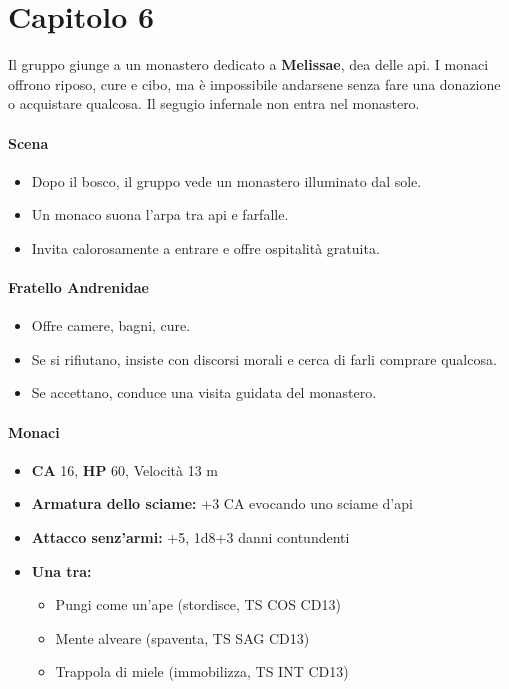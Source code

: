 \documentclass{article}
\begin{document}
\section{Capitolo 6}
Il gruppo giunge a un monastero dedicato a \textbf{Melissae}, dea delle api. I monaci offrono riposo, cure e cibo, ma è impossibile andarsene senza fare una donazione o acquistare qualcosa. Il segugio infernale non entra nel monastero.

\paragraph{Scena}
\begin{itemize}
    \item Dopo il bosco, il gruppo vede un monastero illuminato dal sole.
    \item Un monaco suona l’arpa tra api e farfalle.
    \item Invita calorosamente a entrare e offre ospitalità gratuita.
\end{itemize}

\paragraph{Fratello Andrenidae}
\begin{itemize}
    \item Offre camere, bagni, cure.
    \item Se si rifiutano, insiste con discorsi morali e cerca di farli comprare qualcosa.
    \item Se accettano, conduce una visita guidata del monastero.
\end{itemize}

\paragraph{Monaci}
\begin{itemize}
    \item \textbf{CA} 16, \textbf{HP} 60, Velocità 13 m
    \item \textbf{Armatura dello sciame:} +3 CA evocando uno sciame d’api
    \item \textbf{Attacco senz’armi:} +5, 1d8+3 danni contundenti
    \item \textbf{Una tra:}
    \begin{itemize}
        \item Pungi come un’ape (stordisce, TS COS CD13)
        \item Mente alveare (spaventa, TS SAG CD13)
        \item Trappola di miele (immobilizza, TS INT CD13)
    \end{itemize}
\end{itemize}
\end{document}
